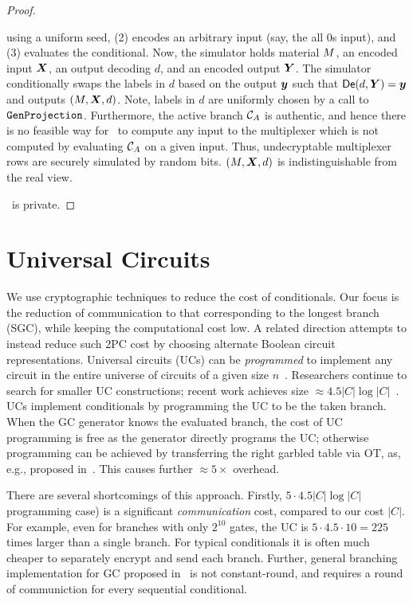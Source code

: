 \begin{proof}
\begin{itemize}
      using a uniform seed, (2) encodes an arbitrary input (say, the
      all 0s input), and (3) evaluates the conditional.
      Now, the simulator holds material $M$, an encoded input
      $\gcirinp$, an output decoding $d$, and an encoded output
      $\gcirout$.
      The simulator conditionally swaps the labels in $d$ based on the
      output $\cirout$ such that $\gDe(d, \gcirout) = \cirout$ and
      outputs $(\mat, \gcirinp, d)$.
      Note, labels in $d$ are uniformly chosen by a call to
      $\mathtt{GenProjection}$.
      Furthermore, the active branch $\mathcal C_{A}$ is authentic, and
      hence there is no feasible way for \adv\ to compute any input to
      the multiplexer which is
      not computed by evaluating $\mathcal C_{A}$ on a given input.
      Thus, undecryptable multiplexer rows are securely simulated by
      random bits.
      $(\mat, \gcirinp, d)$ is indistinguishable from the real view.
  \end{itemize}
  \ourschemelong\ is private.
\end{proof}

\section{Universal Circuits}
We use cryptographic techniques to reduce the cost of conditionals.
Our focus is the reduction of communication to that corresponding to
the longest branch (SGC), while keeping the computational cost low.
A related direction attempts to instead reduce such 2PC cost by
choosing alternate Boolean circuit representations.  Universal
circuits (UCs) can be \emph{programmed} to implement any circuit in
the entire universe of circuits of a given size
$n$~\cite{STOC:Valiant76}.  Researchers continue to search for smaller
UC constructions; recent work achieves size $\approx 4.5 |C| \log
|C|$~\cite{EPRINT:LipMohSad16,EC:KisSch16,AC:GunKisSch17,EPRINT:ZYZL19,EPRINT:AGKS19}.
%
UCs implement conditionals by programming the UC to be the taken
branch.  When the GC generator knows the evaluated branch, the cost of
UC programming is free as the generator directly programs the UC;
otherwise programming can be achieved by transferring the right
garbled table via OT, as, e.g., proposed in~\cite{AC:KenKolWil17}.
This causes further $\approx 5\times$ overhead.

There are several shortcomings of this approach.  Firstly,  $5\cdot
4.5 |C| \log |C|$ %
programming case) is a significant {\em communication} cost, compared
to our cost $|C|$.  For example, even for branches with only $2^{10}$
gates, the UC is $5 \cdot 4.5 \cdot 10 = 225$ times larger than a
single branch.  For typical conditionals it is often much cheaper to
separately encrypt and send each branch.  Further, general branching
implementation for GC proposed in~\cite{AC:KenKolWil17} is not
constant-round, and requires a round of communiction for every
sequential conditional.


